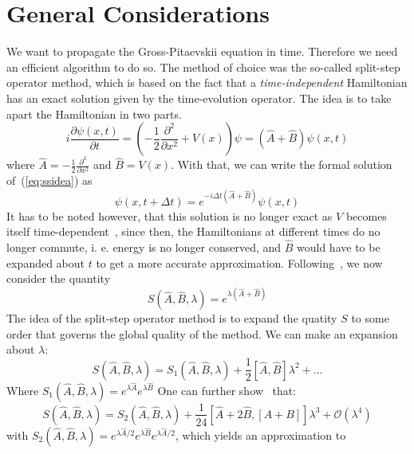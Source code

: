 \section{General Considerations}
We want to propagate the Gross-Pitaevskii equation in time. Therefore we need an efficient algorithm to do so. The method of choice was the so-called 
split-step operator method, which is based on the fact that a \emph{time-independent} Hamiltonian has an exact solution given by the time-evolution 
operator.
The idea is to take apart the Hamiltonian in two parts.
\begin{equation}\label{eq:ssidea}
	i\frac{\partial\psi(x, t)}{\partial t}=\left(-\frac{1}{2}\frac{\partial^2}{\partial x^2}+V(x)\right)\psi=\left(\hat{A}+\hat{B}\right)\psi(x, t)
\end{equation}
where $\hat{A}=-\frac{1}{2}\frac{\partial^2}{\partial x^2}$ and $\hat{B}=V(x)$. With that, we can write the formal solution
of~(\ref{eq:ssidea}) as
\begin{equation}\label{eq:ssstep}
	\psi(x, t+\Delta t)=e^{-i\Delta t \left(\hat{A}+\hat{B}\right)}\psi(x, t)
\end{equation}
It has to be noted however, that this solution is no longer exact as $V$ becomes itself
time-dependent~\cite{bandraukshen2}, since then, the Hamiltonians at different times do no longer commute, i. e. energy is
no longer conserved, and $\hat{B}$ would have to be expanded about $t$ to get a more accurate approximation.
Following~\cite{bandraukshen2}, we now consider the quantity
\begin{equation}\label{eq:S}
	S(\hat{A}, \hat{B}, \lambda)= e^{\lambda\left(\hat{A}+\hat{B}\right)}
\end{equation}
The idea of the split-step operator method is to expand the quatity $S$ to some order that governs the global quality of the
method. We can make an expansion about $\lambda$:
\begin{equation}\label{eq:Sexp}
	S(\hat{A},\hat{B},\lambda)=S_1(\hat{A}, \hat{B}, \lambda)+\frac{1}{2}\left[\hat{A},\hat{B}\right]\lambda^2+\ldots
\end{equation}
Where $S_1(\hat{A}, \hat{B}, \lambda)=e^{\lambda\hat{A}}e^{\lambda\hat{B}}$
One can further show~\cite{bandraukshen2, suzuki1} that:
\begin{equation}\label{eq:S2}
	S(\hat{A}, \hat{B},\lambda)=S_2(\hat{A}, \hat{B},
	\lambda)+\frac{1}{24}\left[\hat{A}+2\hat{B},\left[A+B\right]\right]\lambda^3+\mathcal{O}(\lambda^4)
\end{equation} 
with $S_2(\hat{A}, \hat{B}, \lambda)=e^{\lambda\hat{A}/2}e^{\lambda\hat{B}}e^{\lambda\hat{A}/2}$, which yields an approximation to
